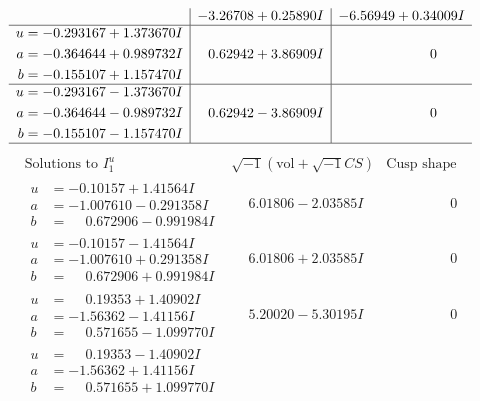 \documentclass[1p]{elsarticle_modified}
\theoremstyle{definition}
\newcommand{\I}{\sqrt{-1}}
\begin{document}
$$\begin{array}{c|c|c}
 & -3.26708 + 0.25890 I & -6.56949 + 0.34009 I \\ \hline\begin{aligned}
u &= -0.293167 + 1.373670 I \\
a &= -0.364644 + 0.989732 I \\
b &= -0.155107 + 1.157470 I\end{aligned}
 & \phantom{-}0.62942 + 3.86909 I & \phantom{-0.000000 } 0 \\ \hline\begin{aligned}
u &= -0.293167 - 1.373670 I \\
a &= -0.364644 - 0.989732 I \\
b &= -0.155107 - 1.157470 I\end{aligned}
 & \phantom{-}0.62942 - 3.86909 I & \phantom{-0.000000 } 0\\
 \hline 
 \end{array}$$\newpage$$\begin{array}{c|c|c}  
\text{Solutions to }I^u_{1}& \I (\text{vol} + \sqrt{-1}CS) & \text{Cusp shape}\\
 \hline 
\begin{aligned}
u &= -0.10157 + 1.41564 I \\
a &= -1.007610 - 0.291358 I \\
b &= \phantom{-}0.672906 - 0.991984 I\end{aligned}
 & \phantom{-}6.01806 - 2.03585 I & \phantom{-0.000000 } 0 \\ \hline\begin{aligned}
u &= -0.10157 - 1.41564 I \\
a &= -1.007610 + 0.291358 I \\
b &= \phantom{-}0.672906 + 0.991984 I\end{aligned}
 & \phantom{-}6.01806 + 2.03585 I & \phantom{-0.000000 } 0 \\ \hline\begin{aligned}
u &= \phantom{-}0.19353 + 1.40902 I \\
a &= -1.56362 - 1.41156 I \\
b &= \phantom{-}0.571655 - 1.099770 I\end{aligned}
 & \phantom{-}5.20020 - 5.30195 I & \phantom{-0.000000 } 0 \\ \hline\begin{aligned}
u &= \phantom{-}0.19353 - 1.40902 I \\
a &= -1.56362 + 1.41156 I \\
b &= \phantom{-}0.571655 + 1.099770 I\end{aligned}

\end{array}$$
\end{document}
